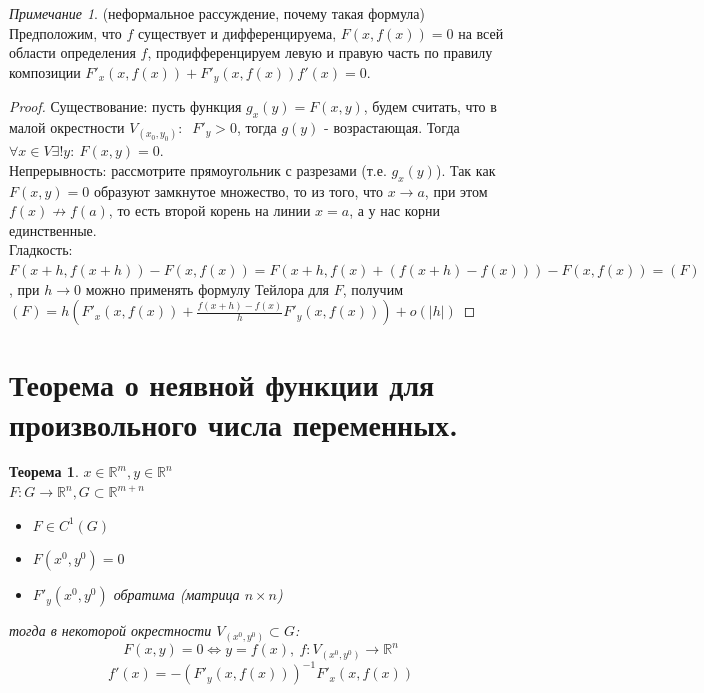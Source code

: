 \documentclass{article}
\theoremstyle{indented}
\newtheorem{theorem}{Теорема}
\theoremstyle{definition}
\theoremstyle{remark}
\newtheorem{remark}{Примечание}
\begin{document}
\begin{remark}
    (неформальное рассуждение, почему такая формула) Предположим, что $f$ существует и дифференцируема,
    $F(x,f(x))=0$ на всей области определения $f$, продифференцируем левую и правую часть по правилу композиции
    $F'_x(x,f(x))+F'_y(x,f(x)) f'(x)=0$.
\end{remark}

\begin{proof}
    Существование: пусть функция $g_x(y) = F(x,y)$, будем считать, что в малой окрестности $V_{(x_0,y_0)}: \ $ 
    $F'_y > 0$, тогда $g(y)$ - возрастающая. Тогда $\forall x \in V \exists ! y: \ F(x,y)=0$. \\
    Непрерывность: рассмотрите прямоугольник с разрезами (т.е. $g_x(y)$). Так как $F(x,y)=0$ образуют
    замкнутое множество, то из того, что $x \to a$, при этом $f(x) \not\to f(a)$, то есть второй корень на линии $x=a$, а у 
    нас корни единственные. \\
    Гладкость: $F(x+h,f(x+h))-F(x,f(x))=F(x+h,f(x)+(f(x+h)-f(x)))-F(x,f(x))=(F)$, при $h\to 0$ можно применять формулу Тейлора 
    для $F$, получим $(F)=h(F'_x(x,f(x))+\frac{f(x+h)-f(x)}{h}F'_y(x,f(x)))+o(|h|)$
\end{proof}

\section{Теорема о неявной функции для произвольного числа переменных.}

\begin{theorem}
    $x\in \mathbb{R}^m , y \in \mathbb{R}^n$\\
    $F: G\to \mathbb{R}^n, G\subset\mathbb{R}^{m+n}$
    \begin{itemize}
        \item $F\in C^1(G)$
        \item $F(x^0,y^0)=0$
        \item $F'_y(x^0,y^0)$ обратима (матрица $n\times n$)
    \end{itemize}
    тогда в некоторой окрестности $V_{(x^0,y^0)} \subset G$: 
    $$F(x,y) = 0 \Leftrightarrow y=f(x), \ f: V_{(x^0,y^0)} \to \mathbb{R}^n$$
    $$f'(x) = -(F'_y(x,f(x)))^{-1} F'_x(x,f(x))$$
\end{theorem}
\end{document}
